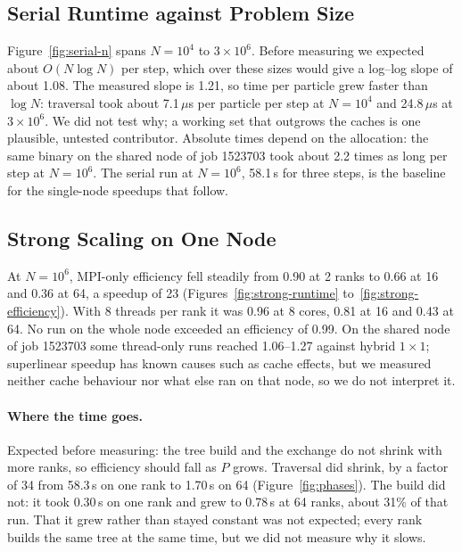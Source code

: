 \documentclass[10pt,a4paper,twocolumn,twoside]{rho-class/rho}
\begin{document}
\subsection{Serial Runtime against Problem Size}
\label{sec:serial}
Figure~\ref{fig:serial-n} spans $N=10^4$ to $3\times10^6$. Before measuring we expected about $O(N\log N)$ per step, which over these sizes would give a log--log slope of about 1.08. The measured slope is 1.21, so time per particle grew faster than $\log N$: traversal took about 7.1\,$\mu$s per particle per step at $N=10^4$ and 24.8\,$\mu$s at $3\times10^6$. We did not test why; a working set that outgrows the caches is one plausible, untested contributor. Absolute times depend on the allocation: the same binary on the shared node of job 1523703 took about 2.2 times as long per step at $N=10^6$. The serial run at $N=10^6$, 58.1\,s for three steps, is the baseline for the single-node speedups that follow.

\subsection{Strong Scaling on One Node}
\label{sec:strong}
At $N=10^6$, MPI-only efficiency fell steadily from 0.90 at 2 ranks to 0.66 at 16 and 0.36 at 64, a speedup of 23 (Figures~\ref{fig:strong-runtime} to~\ref{fig:strong-efficiency}). With 8 threads per rank it was 0.96 at 8 cores, 0.81 at 16 and 0.43 at 64. No run on the whole node exceeded an efficiency of 0.99. On the shared node of job 1523703 some thread-only runs reached 1.06--1.27 against hybrid $1\times1$; superlinear speedup has known causes such as cache effects, but we measured neither cache behaviour nor what else ran on that node, so we do not interpret it.

\paragraph{Where the time goes.} Expected before measuring: the tree build and the exchange do not shrink with more ranks, so efficiency should fall as $P$ grows. Traversal did shrink, by a factor of 34 from 58.3\,s on one rank to 1.70\,s on 64 (Figure~\ref{fig:phases}). The build did not: it took 0.30\,s on one rank and grew to 0.78\,s at 64 ranks, about 31\% of that run. That it grew rather than stayed constant was not expected; every rank builds the same tree at the same time, but we did not measure why it slows.
\end{document}
